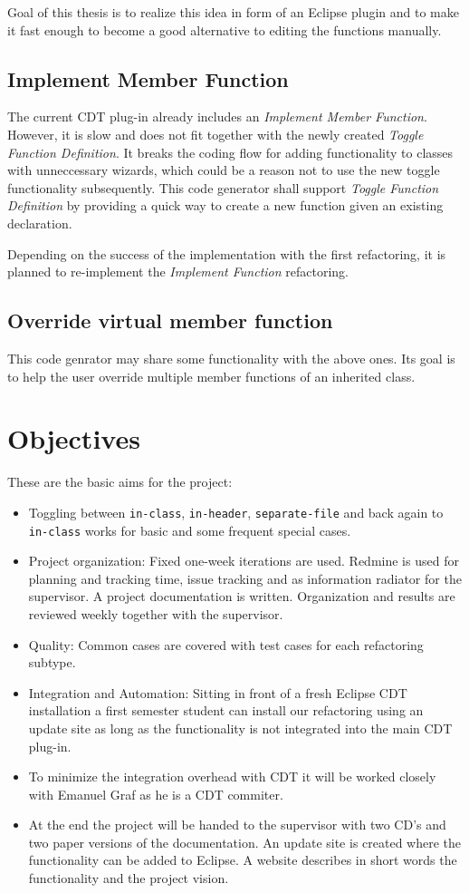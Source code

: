 Goal of this thesis is to realize this idea in form of an Eclipse plugin and to 
make it fast enough to become a good alternative to editing the functions 
manually. 

\subsection{Implement Member Function}
The current CDT plug-in already includes an \textit{Implement Member Function}.
However, it is slow and does not fit together with the newly created 
\textit{Toggle Function Definition}. It breaks the coding flow for adding 
functionality to classes with unneccessary wizards, which could be a reason not 
to use the new toggle functionality subsequently. This code generator shall 
support \textit{Toggle Function Definition} by providing a quick way to create a 
new function given an existing declaration.

Depending on the success of the implementation with the first refactoring, it is 
planned to re-implement the \textit{Implement Function} refactoring.

\subsection{Override virtual member function}
This code genrator may share some functionality with the above ones. Its goal is 
to help the user override multiple member functions of an inherited class.

\section{Objectives}

These are the basic aims for the project:
\begin{itemize}
 \item Toggling between \texttt{in-class}, \texttt{in-header},
\texttt{separate-file} and back again to \texttt{in-class} works for basic and
some frequent special cases.
 \item Project organization: Fixed one-week iterations are used. Redmine is used
for planning and tracking time, issue tracking and as information radiator for
the supervisor. A project documentation is written. Organization and results are
reviewed weekly together with the supervisor.
 \item Quality: Common cases are covered with test cases for each
refactoring subtype.
 \item Integration and Automation: Sitting in front of a fresh Eclipse CDT
installation a first semester student can install our refactoring using an
update site as long as the functionality is not integrated into the main CDT
plug-in.
 \item To minimize the integration overhead with CDT it will be worked closely
with Emanuel Graf as he is a CDT commiter.
 \item At the end the project will be handed to the supervisor with two CD's and
two paper versions of the documentation. An update site is created where the
functionality can be added to Eclipse. A website describes in short words the
functionality and the project vision.
\end{itemize}

